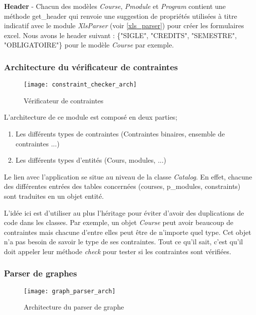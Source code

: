 \textbf{Header} - Chacun des modèles \textit{Course}, \textit{Pmodule} et \textit{Program} contient une méthode get\_header qui renvoie une suggestion de propriétés utilisées à titre indicatif avec le module \textit{XlsParser} (voir \ref{xls_parser}) pour créer les formulaires excel. Nous avons le header suivant : \{"SIGLE", "CREDITS", "SEMESTRE", "OBLIGATOIRE"\} pour le modèle \textit{Course} par exemple.  





\subsubsection{Architecture du vérificateur de contraintes}
\label{constraint_checker}
\begin{figure}[H]
\centering
\caption{Vérificateur de contraintes}
\label{fig:constraint_checker_arch}
\texttt{[image: constraint\_checker\_arch]}
\end{figure}

L'architecture de ce module est composé en deux parties;
\begin{enumerate}
  \item Les différents types de contraintes (Contraintes binaires, ensemble de contraintes ...)
  \item Les différents types d'entités (Cours, modules, ...)
\end{enumerate}

Le lien avec l'application se situe au niveau de la classe \textit{Catalog}. En effet, chacune des différentes entrées des tables concernées (courses, p\_modules, constraints) sont traduites en un objet entité.

L'idée ici est d'utiliser au plus l'héritage pour éviter d'avoir des duplications de code dans les classes. Par exemple, un objet \textit{Course} peut avoir beaucoup de contraintes mais chacune d’entre elles peut être de n'importe quel type. Cet objet n'a pas besoin de savoir le type de ses contraintes. Tout ce qu'il sait, c'est qu'il doit appeler leur méthode \textit{check} pour tester si les contraintes sont vérifiées. 


\subsubsection{Parser de graphes}

\begin{figure}[H]
\centering
\caption{Architecture du parser de graphe}
\label{fig:graph_parser_arch}
\texttt{[image: graph\_parser\_arch]}
\end{figure}

